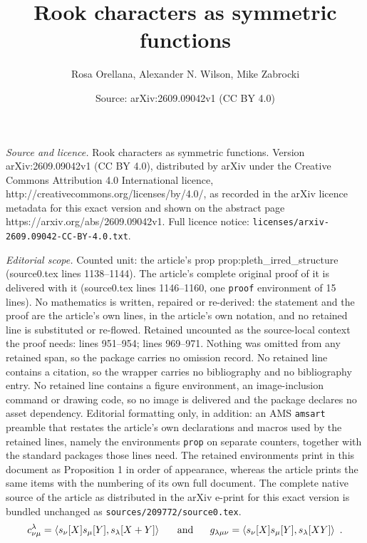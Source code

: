 \documentclass[10pt,a4paper]{amsart}
\title{Rook characters as symmetric functions}
\author{Rosa Orellana, Alexander N. Wilson, Mike Zabrocki}
\date{Source: arXiv:2609.09042v1 (CC BY 4.0)}
\begin{document}
\maketitle

\noindent\emph{Source and licence.} Rook characters as symmetric functions. Version arXiv:2609.09042v1 (CC BY 4.0), distributed by arXiv under the Creative Commons Attribution 4.0 International licence, http://creativecommons.org/licenses/by/4.0/, as recorded in the arXiv licence metadata for this exact version and shown on the abstract page https://arxiv.org/abs/2609.09042v1. Full licence notice: \texttt{licenses/arxiv-2609.09042-CC-BY-4.0.txt}.\par\smallskip

\noindent\textit{Editorial scope.} Counted unit: the article's prop prop:pleth\_irred\_structure (source0.tex lines 1138--1144). The article's complete original proof of it is delivered with it (source0.tex lines 1146--1160, one \texttt{proof} environment of 15 lines). No mathematics is written, repaired or re-derived: the statement and the proof are the article's own lines, in the article's own notation, and no retained line is substituted or re-flowed.  Retained uncounted as the source-local context the proof needs: lines 951--954; lines 969--971.  Nothing was omitted from any retained span, so the package carries no omission record.  No retained line contains a citation, so the wrapper carries no bibliography and no bibliography entry.  No retained line contains a figure environment, an image-inclusion command or drawing code, so no image is delivered and the package declares no asset dependency.  Editorial formatting only, in addition: an AMS \texttt{amsart} preamble that restates the article's own declarations and macros used by the retained lines, namely the environments \texttt{prop} on separate counters, together with the standard packages those lines need.  The retained environments print in this document as Proposition 1 in order of appearance, whereas the article prints the same items with the numbering of its own full document.  The complete native source of the article as distributed in the arXiv e-print for this exact version is bundled unchanged as \texttt{sources/209772/source0.tex}.
\begin{equation}\label{eq:Schur_coproducts}
c^\lambda_{\nu\mu} = \left< s_\nu[X]s_\mu[Y], s_\lambda[X+Y] \right>~~~~~\hbox{and}~~~~~
g_{\lambda\mu\nu} = \left< s_\nu[X]s_\mu[Y], s_\lambda[XY] \right>~.
\end{equation}
\end{document}
